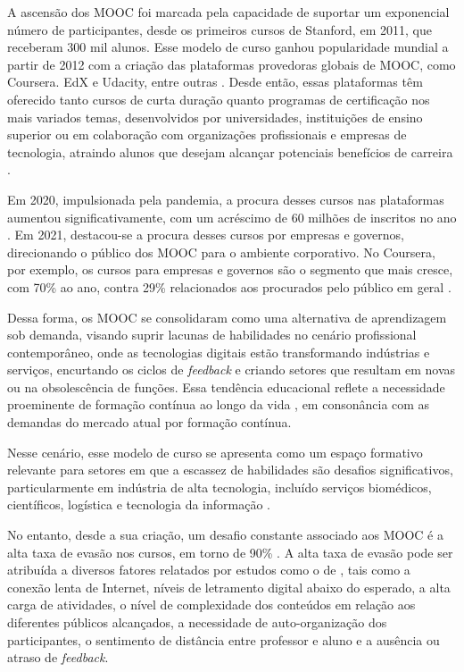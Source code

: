\documentclass[portuguese]{textolivre}
\begin{document}
A ascensão dos MOOC foi marcada pela capacidade de suportar um exponencial número de participantes, desde os primeiros cursos de Stanford, em 2011, que receberam 300 mil alunos. Esse modelo de curso ganhou popularidade mundial a partir de 2012 com a criação das plataformas provedoras globais de MOOC, como Coursera. EdX e Udacity, entre outras \cite{pappano_year_2012}. Desde então, essas plataformas têm oferecido tanto cursos de curta duração quanto programas de certificação nos mais variados temas, desenvolvidos por universidades, instituições de ensino superior ou em colaboração com organizações profissionais e empresas de tecnologia, atraindo alunos que desejam alcançar potenciais benefícios de carreira \cite{goglio_contribution_2021}.

Em 2020, impulsionada pela pandemia, a procura desses cursos nas plataformas aumentou significativamente, com um acréscimo de 60 milhões de inscritos no ano \cite{shah_by_2021}. Em 2021, destacou-se a procura desses cursos por empresas e governos, direcionando o público dos MOOC para o ambiente corporativo. No Coursera, por exemplo, os cursos para empresas e governos são o segmento que mais cresce, com 70\% ao ano, contra 29\% relacionados aos procurados pelo público em geral \cite{shah_by_2021}.

Dessa forma, os MOOC se consolidaram como uma alternativa de aprendizagem sob demanda, visando suprir lacunas de habilidades no cenário profissional contemporâneo, onde as tecnologias digitais estão transformando indústrias e serviços, encurtando os ciclos de \textit{feedback} e criando setores que resultam em novas ou na obsolescência de funções. Essa tendência educacional reflete a necessidade proeminente de formação contínua ao longo da vida \cite{farrow_mooc_2018}, em consonância com as demandas do mercado atual por formação contínua.

Nesse cenário, esse modelo de curso se apresenta como um espaço formativo relevante para setores em que a escassez de habilidades são desafios significativos, particularmente em indústria de alta tecnologia, incluído serviços biomédicos, científicos, logística e tecnologia da informação \cite{rosendale_scaling_2021}.

No entanto, desde a sua criação, um desafio constante associado aos MOOC é a alta taxa de evasão nos cursos, em torno de 90\% \cite{bates_teaching_2019}.  A alta taxa de evasão pode ser atribuída a diversos fatores relatados por estudos como o de \textcite{tang_learning_2017,singh_analysis_2018,yousef_reflections_2021,gil-quintana_citizenship_2020}, tais como a conexão lenta de Internet,  níveis de letramento digital abaixo do esperado, a alta carga de atividades, o nível de complexidade dos conteúdos em relação aos diferentes públicos alcançados, a necessidade de auto-organização dos participantes, o sentimento de distância entre professor e aluno e a ausência ou atraso de \textit{feedback}.
\end{document}

